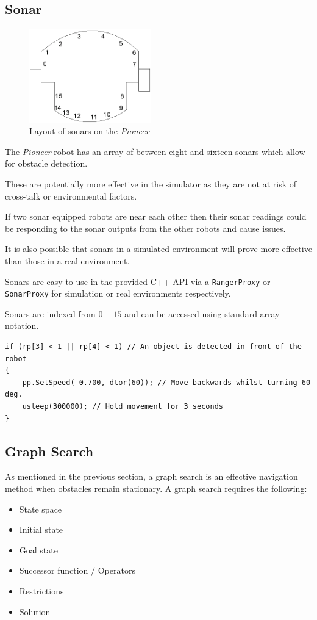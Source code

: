 \documentclass[a4paper,12pt]{article}
\begin{document}
\subsection{Sonar}
\begin{figure}
    \begin{center}
            \includegraphics[width=0.47\textwidth]{images/sonars_wiki_dcs_aber_ac_uk.png}
            \caption{Layout of sonars on the \textit{Pioneer} \cite{sonardiagram}}
    \end{center}
\end{figure}

The \textit{Pioneer} robot has an array of between eight and sixteen sonars which allow for obstacle detection.

These are potentially more effective in the simulator as they are not at risk of cross-talk or environmental factors. 

If two sonar equipped robots are near each other then their sonar readings could be responding to the sonar outputs from the other robots and cause issues.

It is also possible that sonars in a simulated environment will prove more effective than those in a real environment.

Sonars are easy to use in the provided C++ API via a \texttt{RangerProxy} or \texttt{SonarProxy} for simulation or real environments respectively. 

Sonars are indexed from $0-15$ and can be accessed using standard array notation.

\begin{lstlisting}
if (rp[3] < 1 || rp[4] < 1) // An object is detected in front of the robot
{
    pp.SetSpeed(-0.700, dtor(60)); // Move backwards whilst turning 60 deg.
    usleep(300000); // Hold movement for 3 seconds
} 
\end{lstlisting}
\subsection{Graph Search}
As mentioned in the previous section, a graph search is an effective navigation method when obstacles remain stationary. A graph search requires the following:
\begin{itemize}
    \item{State space}
    \item{Initial state}
    \item{Goal state}
    \item{Successor function / Operators}
    \item{Restrictions}
    \item{Solution}
\end{itemize}
\end{document}
